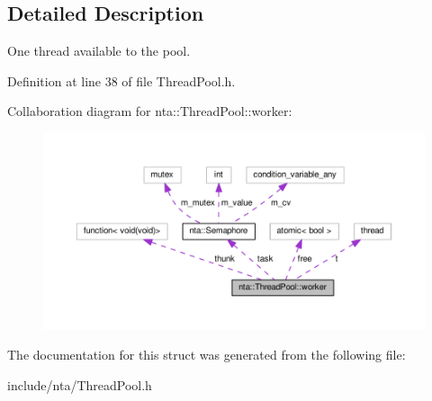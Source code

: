 \subsection{Detailed Description}
One thread available to the pool. 

Definition at line 38 of file Thread\+Pool.\+h.



Collaboration diagram for nta\+:\+:Thread\+Pool\+:\+:worker\+:
\nopagebreak
\begin{figure}[H]
\begin{center}
\leavevmode
\includegraphics[width=350pt]{dc/dec/structnta_1_1ThreadPool_1_1worker__coll__graph}
\end{center}
\end{figure}


The documentation for this struct was generated from the following file\+:\begin{DoxyCompactItemize}
\item 
include/nta/Thread\+Pool.\+h\end{DoxyCompactItemize}
